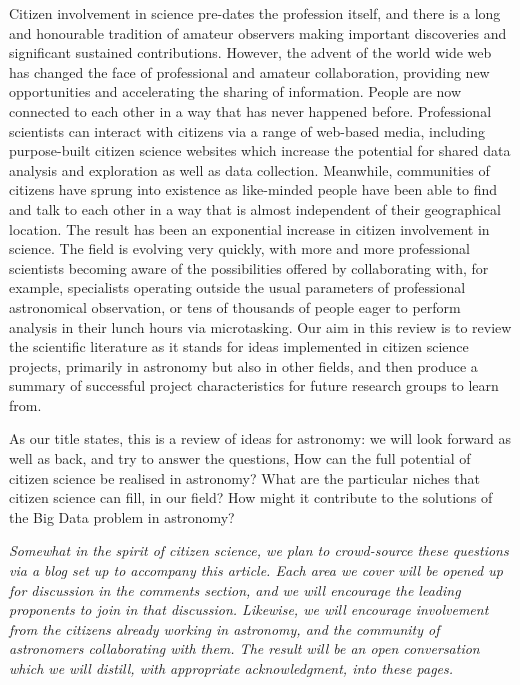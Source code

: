 \documentclass{ar2e}
\begin{document}
Citizen involvement in science pre-dates the profession itself, and there is a
long and honourable tradition of amateur observers making important discoveries
and significant sustained contributions. However, the advent of the world wide
web has changed the face of professional and amateur collaboration, providing
new opportunities and accelerating the sharing of information. People are now
connected to each other in a way that has never happened before. Professional
scientists can interact with citizens via a range of web-based media, including
purpose-built citizen science websites which increase the potential for shared
data analysis and exploration as well as data collection. Meanwhile, communities
of citizens have sprung into existence as like-minded people have been able to
find and talk to each other in a way that is almost independent of their
geographical location. The result has been an exponential increase in citizen
involvement in science. The field is evolving very quickly, with more and more
professional scientists becoming aware of the possibilities offered by
collaborating with, for example, specialists operating outside the usual
parameters of professional astronomical observation, or tens of thousands of
people eager to perform analysis in their lunch hours via microtasking.  Our aim
in this review is to review the scientific literature as it stands for ideas
implemented in citizen science projects, primarily in astronomy but also in
other fields, and then produce a summary of successful project characteristics
for future research groups to learn from.

As our title states, this is a review of ideas for astronomy: we will look
forward as well as back, and try to answer the questions, How can the full
potential of citizen science be realised in astronomy? What are the particular
niches that citizen science can fill, in our field? How might it contribute to
the solutions of the Big Data problem in astronomy?

{\it Somewhat in the spirit of citizen science, we plan to crowd-source these
questions via a blog set up to accompany this article.  Each area we
cover will be opened up for discussion in the comments section, and we will
encourage the leading proponents to join in that discussion. Likewise, we will
encourage involvement from the citizens already working in astronomy, and the 
community of astronomers collaborating with them. The result will be an open
conversation which we will distill, with appropriate acknowledgment, into these
pages.}
\end{document}
